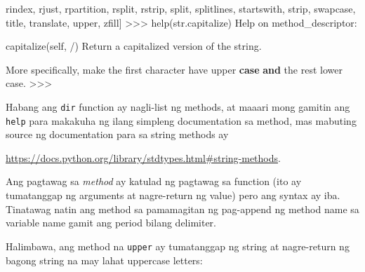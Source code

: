 \documentclass[10pt,]{book}
\newenvironment{Shaded}{}{}
\newcommand{\BuiltInTok}[1]{\textcolor[rgb]{0.00,0.50,0.00}{#1}}
\newcommand{\ControlFlowTok}[1]{\textcolor[rgb]{0.00,0.44,0.13}{\textbf{#1}}}
\newcommand{\KeywordTok}[1]{\textcolor[rgb]{0.00,0.44,0.13}{\textbf{#1}}}
\newcommand{\NormalTok}[1]{#1}
\newcommand{\OperatorTok}[1]{\textcolor[rgb]{0.40,0.40,0.40}{#1}}
\newcommand{\StringTok}[1]{\textcolor[rgb]{0.25,0.44,0.63}{#1}}
\newcommand{\VariableTok}[1]{\textcolor[rgb]{0.10,0.09,0.49}{#1}}
\begin{document}
\begin{Shaded}
\begin{Highlighting}[]
\StringTok{\textquotesingle{}rindex\textquotesingle{}}\NormalTok{, }\StringTok{\textquotesingle{}rjust\textquotesingle{}}\NormalTok{, }\StringTok{\textquotesingle{}rpartition\textquotesingle{}}\NormalTok{, }\StringTok{\textquotesingle{}rsplit\textquotesingle{}}\NormalTok{, }\StringTok{\textquotesingle{}rstrip\textquotesingle{}}\NormalTok{,}
\StringTok{\textquotesingle{}split\textquotesingle{}}\NormalTok{, }\StringTok{\textquotesingle{}splitlines\textquotesingle{}}\NormalTok{, }\StringTok{\textquotesingle{}startswith\textquotesingle{}}\NormalTok{, }\StringTok{\textquotesingle{}strip\textquotesingle{}}\NormalTok{, }\StringTok{\textquotesingle{}swapcase\textquotesingle{}}\NormalTok{,}
\StringTok{\textquotesingle{}title\textquotesingle{}}\NormalTok{, }\StringTok{\textquotesingle{}translate\textquotesingle{}}\NormalTok{, }\StringTok{\textquotesingle{}upper\textquotesingle{}}\NormalTok{, }\StringTok{\textquotesingle{}zfill\textquotesingle{}}\NormalTok{]}
\OperatorTok{\textgreater{}\textgreater{}\textgreater{}} \BuiltInTok{help}\NormalTok{(}\BuiltInTok{str}\NormalTok{.capitalize)}
\NormalTok{Help on method\_descriptor:}

\NormalTok{capitalize(}\VariableTok{self}\NormalTok{, }\OperatorTok{/}\NormalTok{)}
\NormalTok{    Return a capitalized version of the string.}
    
\NormalTok{    More specifically, make the first character have upper}
    \ControlFlowTok{case} \KeywordTok{and}\NormalTok{ the rest lower case.}
\OperatorTok{\textgreater{}\textgreater{}\textgreater{}}
\end{Highlighting}
\end{Shaded}

Habang ang \texttt{dir} function ay nagli-list ng methods, at maaari
mong gamitin ang \texttt{help} para makakuha ng ilang simpleng
documentation sa method, mas mabuting source ng documentation para sa
string methods ay

\url{https://docs.python.org/library/stdtypes.html\#string-methods}.

Ang pagtawag sa \emph{method} ay katulad ng pagtawag sa function (ito ay
tumatanggap ng arguments at nagre-return ng value) pero ang syntax ay
iba. Tinatawag natin ang method sa pamamagitan ng pag-append ng method
name sa variable name gamit ang period bilang delimiter.

Halimbawa, ang method na \texttt{upper} ay tumatanggap ng string at
nagre-return ng bagong string na may lahat uppercase letters:

 
\end{document}
